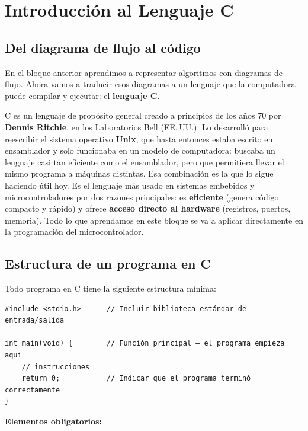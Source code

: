 \chapter{Introducción al Lenguaje C}

\section{Del diagrama de flujo al código}

En el bloque anterior aprendimos a representar algoritmos con diagramas de flujo. Ahora vamos a traducir esos diagramas a un lenguaje que la computadora puede compilar y ejecutar: el \textbf{lenguaje C}.

C es un lenguaje de propósito general creado a principios de los años 70 por \textbf{Dennis Ritchie}, en los Laboratorios Bell (EE.\,UU.). Lo desarrolló para reescribir el sistema operativo \textbf{Unix}, que hasta entonces estaba escrito en ensamblador y solo funcionaba en un modelo de computadora: buscaba un lenguaje casi tan eficiente como el ensamblador, pero que permitiera llevar el mismo programa a máquinas distintas. Esa combinación es la que lo sigue haciendo útil hoy. Es el lenguaje más usado en sistemas embebidos y microcontroladores por dos razones principales: es \textbf{eficiente} (genera código compacto y rápido) y ofrece \textbf{acceso directo al hardware} (registros, puertos, memoria). Todo lo que aprendamos en este bloque se va a aplicar directamente en la programación del microcontrolador.

\section{Estructura de un programa en C}

Todo programa en C tiene la siguiente estructura mínima:

\begin{lstlisting}[style=estilo-c]
#include <stdio.h>      // Incluir biblioteca estándar de entrada/salida

int main(void) {        // Función principal — el programa empieza aquí
    // instrucciones
    return 0;           // Indicar que el programa terminó correctamente
}
\end{lstlisting}

\textbf{Elementos obligatorios:}


